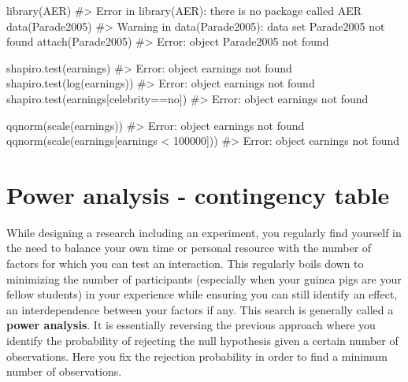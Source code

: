 \documentclass[
  letterpaper,
  DIV=11,
  numbers=noendperiod]{scrreprt}
\newenvironment{Shaded}{\begin{snugshade}}{\end{snugshade}}
\newcommand{\CommentTok}[1]{\textcolor[rgb]{0.37,0.37,0.37}{#1}}
\newcommand{\DecValTok}[1]{\textcolor[rgb]{0.68,0.00,0.00}{#1}}
\newcommand{\FunctionTok}[1]{\textcolor[rgb]{0.28,0.35,0.67}{#1}}
\newcommand{\NormalTok}[1]{\textcolor[rgb]{0.00,0.23,0.31}{#1}}
\newcommand{\SpecialCharTok}[1]{\textcolor[rgb]{0.37,0.37,0.37}{#1}}
\newcommand{\StringTok}[1]{\textcolor[rgb]{0.13,0.47,0.30}{#1}}
\begin{document}
\begin{Shaded}
\begin{Highlighting}[]
\FunctionTok{library}\NormalTok{(AER)}
\CommentTok{\#\textgreater{} Error in library(AER): there is no package called \textquotesingle{}AER\textquotesingle{}}
\FunctionTok{data}\NormalTok{(Parade2005)}
\CommentTok{\#\textgreater{} Warning in data(Parade2005): data set \textquotesingle{}Parade2005\textquotesingle{} not found}
\FunctionTok{attach}\NormalTok{(Parade2005)}
\CommentTok{\#\textgreater{} Error: object \textquotesingle{}Parade2005\textquotesingle{} not found}

\FunctionTok{shapiro.test}\NormalTok{(earnings)}
\CommentTok{\#\textgreater{} Error: object \textquotesingle{}earnings\textquotesingle{} not found}
\FunctionTok{shapiro.test}\NormalTok{(}\FunctionTok{log}\NormalTok{(earnings))}
\CommentTok{\#\textgreater{} Error: object \textquotesingle{}earnings\textquotesingle{} not found}
\FunctionTok{shapiro.test}\NormalTok{(earnings[celebrity}\SpecialCharTok{==}\StringTok{\textquotesingle{}no\textquotesingle{}}\NormalTok{])}
\CommentTok{\#\textgreater{} Error: object \textquotesingle{}earnings\textquotesingle{} not found}

\FunctionTok{qqnorm}\NormalTok{(}\FunctionTok{scale}\NormalTok{(earnings))}
\CommentTok{\#\textgreater{} Error: object \textquotesingle{}earnings\textquotesingle{} not found}
\FunctionTok{qqnorm}\NormalTok{(}\FunctionTok{scale}\NormalTok{(earnings[earnings }\SpecialCharTok{\textless{}} \DecValTok{100000}\NormalTok{]))}
\CommentTok{\#\textgreater{} Error: object \textquotesingle{}earnings\textquotesingle{} not found}
\end{Highlighting}
\end{Shaded}

\chapter{Power analysis - contingency
table}\label{power-analysis---contingency-table}

While designing a research including an experiment, you regularly find
yourself in the need to balance your own time or personal resource with
the number of factors for which you can test an interaction. This
regularly boils down to minimizing the number of participants
(especially when your guinea pigs are your fellow students) in your
experience while ensuring you can still identify an effect, an
interdependence between your factors if any. This search is generally
called a \textbf{power analysis}. It is essentially reversing the
previous approach where you identify the probability of rejecting the
null hypothesis given a certain number of observations. Here you fix the
rejection probability in order to find a minimum number of observations.
\end{document}
